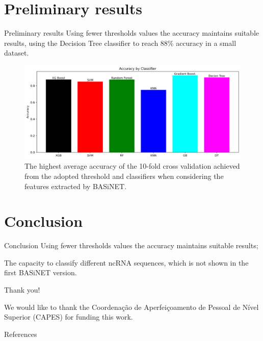 \documentclass[10pt]{beamer}
\begin{document}
\section{Preliminary results}

\begin{frame}{Preliminary results}
Using fewer thresholds values the accuracy maintains suitable results, using the Decision Tree classifier to reach 88\% accuracy in a small dataset.

\pause

\begin{figure}[!ht]
	\centering
	\includegraphics[scale=0.3]{fig/barplot.png}
	\caption{The  highest  average  accuracy  of  the  10-fold  cross  validation  achieved  from  the adopted threshold and classifiers when considering the features extracted by BASiNET.}
	\label{fig:overview}
\end{figure}  
    
\end{frame}

\section{Conclusion}

\begin{frame}{Conclusion}
Using fewer thresholds values the accuracy maintains suitable results;

\pause

The capacity to classify different ncRNA sequences, which is not shown in the first BASiNET version.

\end{frame}

{
\begin{frame}[standout]
  Thank you!
  
  \pause
  
  \footnotesize{We would like to thank the Coordenação de Aperfeiçoamento de Pessoal de Nível Superior (CAPES) for funding this work.}
\end{frame}
}

\begin{frame}[allowframebreaks]{References}

  
  

\end{frame}
\end{document}
